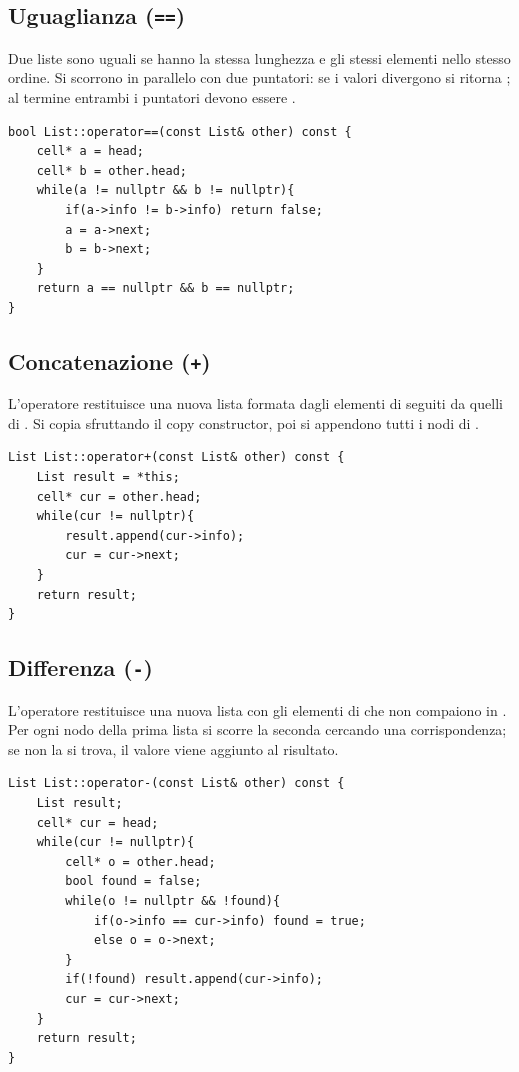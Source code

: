 \subsection{Uguaglianza (\texttt{==})}
Due liste sono uguali se hanno la stessa lunghezza e gli stessi elementi nello stesso ordine. Si scorrono in parallelo con due puntatori: se i valori divergono si ritorna ; al termine entrambi i puntatori devono essere .

\begin{codebox}
    \begin{lstlisting}
bool List::operator==(const List& other) const {
    cell* a = head;
    cell* b = other.head;
    while(a != nullptr && b != nullptr){
        if(a->info != b->info) return false;
        a = a->next;
        b = b->next;
    }
    return a == nullptr && b == nullptr;
}
    \end{lstlisting}
\end{codebox}

\subsection{Concatenazione (\texttt{+})}
L'operatore \inlinecode{+} restituisce una nuova lista formata dagli elementi di  seguiti da quelli di . Si copia  sfruttando il copy constructor, poi si appendono tutti i nodi di .

\begin{codebox}
    \begin{lstlisting}
List List::operator+(const List& other) const {
    List result = *this;
    cell* cur = other.head;
    while(cur != nullptr){
        result.append(cur->info);
        cur = cur->next;
    }
    return result;
}
    \end{lstlisting}
\end{codebox}

\subsection{Differenza (\texttt{-})}
L'operatore \inlinecode{-} restituisce una nuova lista con gli elementi di  che non compaiono in . Per ogni nodo della prima lista si scorre la seconda cercando una corrispondenza; se non la si trova, il valore viene aggiunto al risultato.

\begin{codebox}
    \begin{lstlisting}
List List::operator-(const List& other) const {
    List result;
    cell* cur = head;
    while(cur != nullptr){
        cell* o = other.head;
        bool found = false;
        while(o != nullptr && !found){
            if(o->info == cur->info) found = true;
            else o = o->next;
        }
        if(!found) result.append(cur->info);
        cur = cur->next;
    }
    return result;
}
    \end{lstlisting}
\end{codebox}

